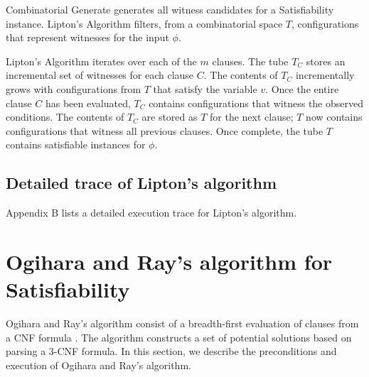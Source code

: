 
{\sc Combinatorial Generate} generates all witness candidates for a {\sc Satisfiability} instance.  {\sc Lipton's Algorithm} filters, from a combinatorial space $T$, configurations that represent witnesses for the input $\phi$.


	
\FloatBarrier

{\sc Lipton's Algorithm} iterates over each of the $m$ clauses.  The tube $T_C$ stores an incremental set of witnesses for each clause $C$.  The contents of $T_C$ incrementally grows with configurations from $T$ that satisfy the variable $v$.  Once the entire clause $C$ has been evaluated, $T_C$ contains configurations that witness the observed conditions.  The contents of $T_C$ are stored as $T$ for the next clause; $T$ now contains configurations that witness all previous clauses.  Once complete, the tube $T$ contains satisfiable instances for $\phi$.  


	
	\subsection{Detailed trace of Lipton's algorithm}
	
Appendix B lists a detailed execution trace for Lipton's algorithm.
	



\section{Ogihara and Ray's algorithm for {\sc Satisfiability}}


Ogihara and Ray's algorithm consist of a breadth-first evaluation of clauses from a CNF formula \cite{Ogihara:1996:BFS:898228,Ogihara97dna-basedparallel}.  The algorithm constructs a set of potential solutions based on parsing a 3-CNF formula.  In this section, we describe the preconditions and execution of Ogihara and Ray's algorithm.

